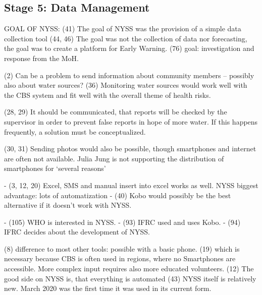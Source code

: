 \subsection{Stage 5: Data Management}












GOAL OF NYSS:
(41) The goal of NYSS was the provision of a simple data collection tool
(44, 46) The goal was not the collection of data nor forecasting, the goal was to create a platform for Early Warning.
(76) goal: investigation and response from the MoH.


(2) Can be a problem to send information about community members – possibly also about water sources? 
(36) Monitoring water sources would work well with the CBS system and fit well with the overall theme of health risks.

(28, 29) It should be communicated, that reports will be checked by the supervisor in order to prevent false reports in hope of more water. If this happens frequently, a solution must be conceptualized.

(30, 31) Sending photos would also be possible, though smartphones and internet are often not available. Julia Jung is not supporting the distribution of smartphones for ‘several reasons’

-	(3, 12, 20) Excel, SMS and manual insert into excel works as well. NYSS biggest advantage: lots of automatization
-	(40) Kobo would possibly be the best alternative if it doesn’t work with NYSS.

-	(105) WHO is interested in NYSS.
-	(93) IFRC used and uses Kobo.
-	(94) IFRC decides about the development of NYSS.

(8) difference to most other tools: possible with a basic phone. (19) which is necessary because CBS is often used in regions, where no Smartphones are accessible. More complex input requires also more educated volunteers.
(12) The good side on NYSS is, that everything is automated
(43) NYSS itself is relatively new. March 2020 was the first time it was used in its current form.

